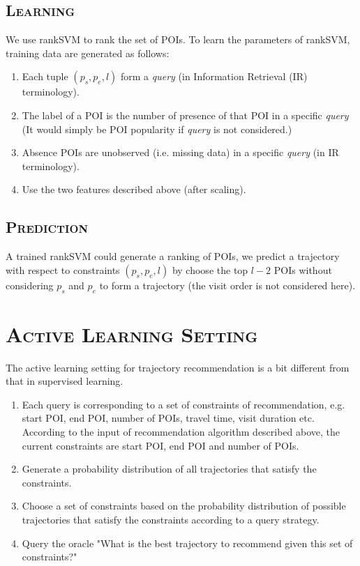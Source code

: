 \documentclass[11pt, a4paper]{article}
\begin{document}
\subsection{\textsc{Learning}}
We use rankSVM\cite{herbrich99} to rank the set of POIs.
To learn the parameters of rankSVM,
training data are generated as follows:
\begin{enumerate}
\item Each tuple $(p_s, p_e, l)$ form a \textit{query} (in Information Retrieval (IR) terminology). 
\item The label of a POI is the number of presence of that POI in a specific \textit{query} 
      (It would simply be POI popularity if \textit{query} is not considered.)
\item Absence POIs are unobserved (i.e. missing data) in a specific \textit{query} (in IR terminology).
\item Use the two features described above (after scaling).
\end{enumerate}

\subsection{\textsc{Prediction}}
A trained rankSVM could generate a ranking of POIs, we predict a trajectory with respect to constraints
$(p_s, p_e, l)$ by choose the top $l-2$ POIs without considering 
$p_s$ and $p_e$ to form a trajectory (the visit order is not considered here).


\section{\textsc{Active Learning Setting}}
The active learning setting for trajectory recommendation is a bit different from that in supervised learning.
\begin{enumerate}
\item Each query is corresponding to a set of constraints of recommendation, 
      e.g. start POI, end POI, number of POIs, travel time, visit duration etc.
      According to the input of recommendation algorithm described above, 
      the current constraints are start POI, end POI and number of POIs.
\item Generate a probability distribution of all trajectories that satisfy the constraints.
\item Choose a set of constraints based on the probability distribution of possible trajectories that satisfy the constraints
      according to a query strategy.
\item Query the oracle "What is the best trajectory to recommend given this set of constraints?"
\end{enumerate}
\end{document}
